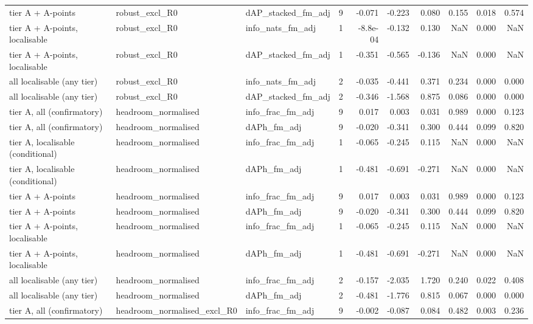 \begin{tabular}{lllrrrrrrr}
tier A + A-points & robust\_excl\_R0 & dAP\_stacked\_fm\_adj & 9 & -0.071 & -0.223 & 0.080 & 0.155 & 0.018 & 0.574 \\
tier A + A-points, localisable & robust\_excl\_R0 & info\_nats\_fm\_adj & 1 & -8.8e-04 & -0.132 & 0.130 & NaN & 0.000 & NaN \\
tier A + A-points, localisable & robust\_excl\_R0 & dAP\_stacked\_fm\_adj & 1 & -0.351 & -0.565 & -0.136 & NaN & 0.000 & NaN \\
all localisable (any tier) & robust\_excl\_R0 & info\_nats\_fm\_adj & 2 & -0.035 & -0.441 & 0.371 & 0.234 & 0.000 & 0.000 \\
all localisable (any tier) & robust\_excl\_R0 & dAP\_stacked\_fm\_adj & 2 & -0.346 & -1.568 & 0.875 & 0.086 & 0.000 & 0.000 \\
tier A, all (confirmatory) & headroom\_normalised & info\_frac\_fm\_adj & 9 & 0.017 & 0.003 & 0.031 & 0.989 & 0.000 & 0.123 \\
tier A, all (confirmatory) & headroom\_normalised & dAPh\_fm\_adj & 9 & -0.020 & -0.341 & 0.300 & 0.444 & 0.099 & 0.820 \\
tier A, localisable (conditional) & headroom\_normalised & info\_frac\_fm\_adj & 1 & -0.065 & -0.245 & 0.115 & NaN & 0.000 & NaN \\
tier A, localisable (conditional) & headroom\_normalised & dAPh\_fm\_adj & 1 & -0.481 & -0.691 & -0.271 & NaN & 0.000 & NaN \\
tier A + A-points & headroom\_normalised & info\_frac\_fm\_adj & 9 & 0.017 & 0.003 & 0.031 & 0.989 & 0.000 & 0.123 \\
tier A + A-points & headroom\_normalised & dAPh\_fm\_adj & 9 & -0.020 & -0.341 & 0.300 & 0.444 & 0.099 & 0.820 \\
tier A + A-points, localisable & headroom\_normalised & info\_frac\_fm\_adj & 1 & -0.065 & -0.245 & 0.115 & NaN & 0.000 & NaN \\
tier A + A-points, localisable & headroom\_normalised & dAPh\_fm\_adj & 1 & -0.481 & -0.691 & -0.271 & NaN & 0.000 & NaN \\
all localisable (any tier) & headroom\_normalised & info\_frac\_fm\_adj & 2 & -0.157 & -2.035 & 1.720 & 0.240 & 0.022 & 0.408 \\
all localisable (any tier) & headroom\_normalised & dAPh\_fm\_adj & 2 & -0.481 & -1.776 & 0.815 & 0.067 & 0.000 & 0.000 \\
tier A, all (confirmatory) & headroom\_normalised\_excl\_R0 & info\_frac\_fm\_adj & 9 & -0.002 & -0.087 & 0.084 & 0.482 & 0.003 & 0.236 \\

\end{tabular}
